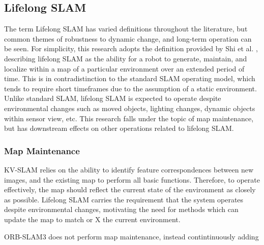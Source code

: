 \subsection{Lifelong SLAM}

The term Lifelong SLAM has varied definitions throughout the literature, but common themes of robustness to dynamic change, and long-term operation can be seen. For simplicity, this research adopts the definition provided by Shi et al. \cite{shiAreWeReady2020}, describing lifelong SLAM as the ability for a robot to generate, maintain, and localize within a map of a particular environment over an extended period of time. This is in contradistinction to the standard SLAM operating model, which tends to require short timeframes due to the assumption of a static environment. Unlike standard SLAM, lifelong SLAM is expected to operate despite environmental changes such as moved objects, lighting changes, dynamic objects within sensor view, etc. This research falls under the topic of map maintenance, but has downstream effects on other operations related to lifelong SLAM.

\subsubsection{Map Maintenance}

KV-SLAM relies on the ability to identify feature correspondences between new images, and the existing map to perform all basic functions. Therefore, to operate effectively, the map should reflect the current state of the environment as closely as possible. Lifelong SLAM carries the requirement that the system operates despite environmental changes, motivating the need for methods which can update the map to match or X the current environment.

ORB-SLAM3 does not perform map maintenance, instead contintinuously adding 
